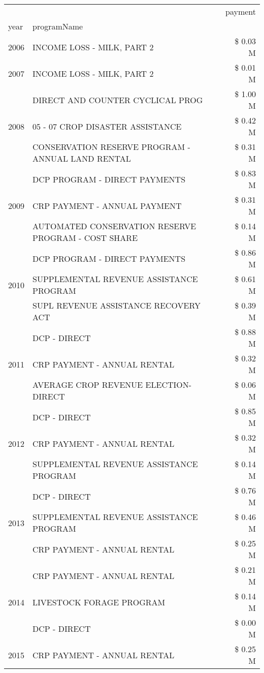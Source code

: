 \begin{tabular}{llr}
\toprule
 &  & payment \\
year & programName &  \\
\midrule
2006 & INCOME LOSS - MILK, PART 2 & \$ 0.03 M \\
\cline{1-3}
2007 & INCOME LOSS - MILK, PART 2 & \$ 0.01 M \\
\cline{1-3}
\multirow[t]{3}{*}{2008} & DIRECT AND COUNTER CYCLICAL PROG & \$ 1.00 M \\
 & 05 - 07 CROP DISASTER ASSISTANCE & \$ 0.42 M \\
 & CONSERVATION RESERVE PROGRAM - ANNUAL LAND RENTAL & \$ 0.31 M \\
\cline{1-3}
\multirow[t]{3}{*}{2009} & DCP PROGRAM - DIRECT PAYMENTS & \$ 0.83 M \\
 & CRP PAYMENT - ANNUAL PAYMENT & \$ 0.31 M \\
 & AUTOMATED CONSERVATION RESERVE PROGRAM - COST SHARE & \$ 0.14 M \\
\cline{1-3}
\multirow[t]{3}{*}{2010} & DCP PROGRAM - DIRECT PAYMENTS & \$ 0.86 M \\
 & SUPPLEMENTAL REVENUE ASSISTANCE PROGRAM & \$ 0.61 M \\
 & SUPL REVENUE ASSISTANCE RECOVERY ACT & \$ 0.39 M \\
\cline{1-3}
\multirow[t]{3}{*}{2011} & DCP - DIRECT & \$ 0.88 M \\
 & CRP PAYMENT - ANNUAL RENTAL & \$ 0.32 M \\
 & AVERAGE CROP REVENUE ELECTION-DIRECT & \$ 0.06 M \\
\cline{1-3}
\multirow[t]{3}{*}{2012} & DCP - DIRECT & \$ 0.85 M \\
 & CRP PAYMENT - ANNUAL RENTAL & \$ 0.32 M \\
 & SUPPLEMENTAL REVENUE ASSISTANCE PROGRAM & \$ 0.14 M \\
\cline{1-3}
\multirow[t]{3}{*}{2013} & DCP - DIRECT & \$ 0.76 M \\
 & SUPPLEMENTAL REVENUE ASSISTANCE PROGRAM & \$ 0.46 M \\
 & CRP PAYMENT - ANNUAL RENTAL & \$ 0.25 M \\
\cline{1-3}
\multirow[t]{3}{*}{2014} & CRP PAYMENT - ANNUAL RENTAL & \$ 0.21 M \\
 & LIVESTOCK FORAGE PROGRAM & \$ 0.14 M \\
 & DCP - DIRECT & \$ 0.00 M \\
\cline{1-3}
\multirow[t]{3}{*}{2015} & CRP PAYMENT - ANNUAL RENTAL & \$ 0.25 M \\

\end{tabular}
